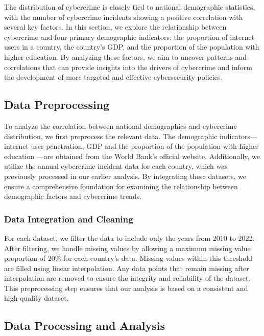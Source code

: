 
The distribution of cybercrime is closely tied to national demographic statistics,
with the number of cybercrime incidents showing a positive correlation with several key factors.
In this section, we explore the relationship between cybercrime and four primary demographic indicators:
the proportion of internet users in a country,
the country's GDP, and the proportion of the population with higher education.
By analyzing these factors,
we aim to uncover patterns and correlations that can provide insights into the drivers of cybercrime
and inform the development of more targeted and effective cybersecurity policies.
\subsection{Data Preprocessing}\label{subsec:data-preprocessing} %
    To analyze the correlation between national demographics and cybercrime distribution,
    we first preprocess the relevant data.
    The demographic indicators—internet user penetration\cite{it-net-user-zs}, 
    GDP\cite{ny-gdp-mktp-cd} and 
    the proportion of the population with higher education\cite{se-ter-enrr}
    —are obtained from the World Bank's official website.
    Additionally, we utilize the annual cybercrime incident data for each country,
    which was previously processed in our earlier analysis.
    By integrating these datasets,
    we ensure a comprehensive foundation for examining the relationship between demographic factors and cybercrime trends.

    \subsubsection{Data Integration and Cleaning} %
        For each dataset, we filter the data to include only the years from 2010 to 2022.
        After filtering,
        we handle missing values by allowing a maximum missing value proportion of 20\% for each country's data.
        Missing values within this threshold are filled using linear interpolation.
        Any data points that remain missing after interpolation
        are removed to ensure the integrity and reliability of the dataset.
        This preprocessing step ensures that our analysis is based on a consistent and high-quality dataset.

\subsection{Data Processing and Analysis}\label{subsec:data-processing-and-analysis} %
